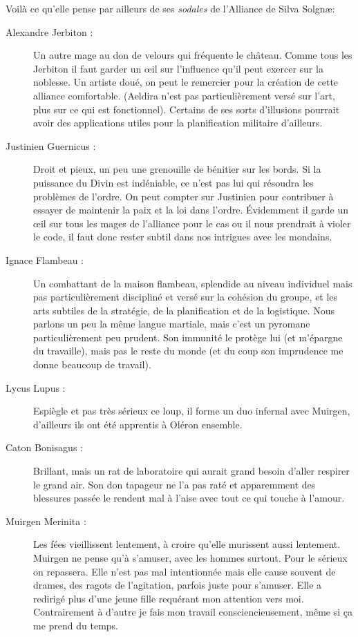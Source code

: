Voilà ce qu'elle pense par ailleurs de ses \emph{sodales} de l'Alliance de Silva Solgnæ:
\begin{description}
\item[Alexandre Jerbiton :] Un autre mage au don de velours qui fréquente le château. Comme tous les Jerbiton il faut garder un œil sur l'influence qu'il peut exercer sur la noblesse. Un artiste doué, on peut le remercier pour la création de cette alliance comfortable. (Aeldira n'est pas particulièrement versé sur l'art, plus sur ce qui est fonctionnel). Certains de ses sorts d'illusions pourrait avoir des applications utiles pour la planification militaire d'ailleurs.
\item[Justinien Guernicus :] Droit et pieux, un peu une grenouille de bénitier sur les bords. Si la puissance du Divin est indéniable, ce n'est pas lui qui résoudra les problèmes de l'ordre. On peut compter sur Justinien pour contribuer à essayer de maintenir la paix et la loi dans l'ordre. Évidemment il garde un œil sur tous les mages de l'alliance pour le cas ou il nous prendrait à violer le code, il faut donc rester subtil dans nos intrigues avec les mondains.
\item[Ignace Flambeau :] Un combattant de la maison flambeau, splendide au niveau individuel mais pas particulièrement discipliné et versé sur la cohésion du groupe, et les arts subtiles de la stratégie, de la planification et de la logistique. Nous parlons un peu la même langue martiale, mais c'est un pyromane particulièrement peu prudent. Son immunité le protège lui (et m'épargne du travaille), mais pas le reste du monde (et du coup son imprudence me donne beaucoup de travail).
\item[Lycus Lupus :] Espiègle et pas très sérieux ce loup, il forme un duo infernal avec Muirgen, d'ailleurs ils ont été apprentis à Oléron ensemble.
\item[Caton Bonisagus :] Brillant, mais un rat de laboratoire qui aurait grand besoin d'aller respirer le grand air. Son don tapageur ne l'a pas raté et apparemment des blessures passée le rendent mal à l'aise avec tout ce qui touche à l'amour.
\item[Muirgen Merinita :] Les fées vieillissent lentement, à croire qu'elle murissent aussi lentement. Muirgen ne pense qu'à s'amuser, avec les hommes surtout. Pour le sérieux on repassera. Elle n'est pas mal intentionnée mais elle cause souvent de drames, des ragots de l'agitation, parfois juste pour s'amuser. Elle a redirigé plus d'une jeune fille requérant mon attention vers moi. Contrairement à d'autre je fais mon travail consciencieusement, même si ça me prend du temps.
\end{description}

